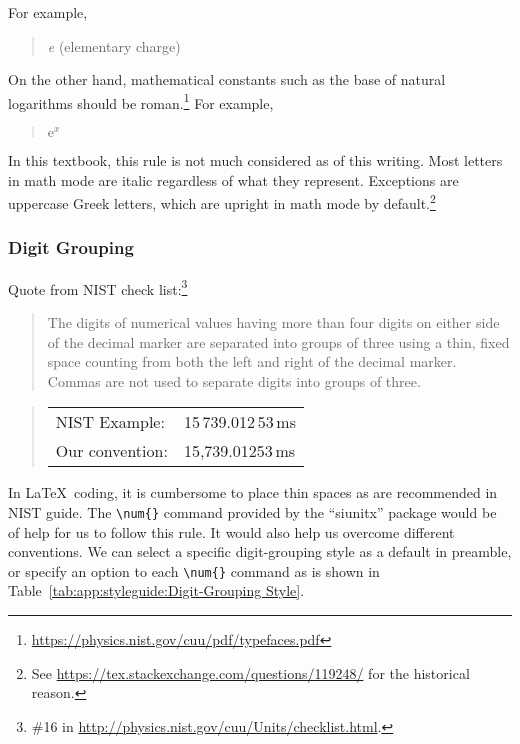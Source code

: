 For example,
\begin{quote}
  {\textit e} (elementary charge)
\end{quote}

On the other hand, mathematical constants such as the base
of natural logarithms should be roman.\footnote{
  \url{https://physics.nist.gov/cuu/pdf/typefaces.pdf}
}
For example,

\begin{quote}
  $\mathrm{e}^x$
\end{quote}

In this textbook, this rule is not much considered as of this writing.
Most letters in math mode are italic regardless of what they
represent. Exceptions are uppercase Greek letters, which are upright
in math mode by default.\footnote{
  See \url{https://tex.stackexchange.com/questions/119248/}
  for the historical reason.}

\subsubsection{Digit Grouping}
\label{sec:app:styleguide:Digit Grouping}

Quote from NIST check list:\footnote{
  \#16 in \url{http://physics.nist.gov/cuu/Units/checklist.html}.
}

\begin{quote}
  The digits of numerical values having more than four digits on either
  side of the decimal marker are separated into groups of three using
  a thin, fixed space counting from both the left and right of the decimal
  marker. Commas are not used to separate digits into groups of three.
\end{quote}

\begin{quote}
\begin{tabular}{ll}
  NIST Example:& 15\,739.012\,53\,ms\\
  Our convention:& 15,739.01253\,ms\\
\end{tabular}
\end{quote}

In \LaTeX\ coding, it is cumbersome to place thin spaces as are recommended
in NIST guide. The \verb|\num{}| command provided by the ``siunitx''
package would be of help for us to follow this rule.
It would also help us overcome different conventions.
We can select a specific digit-grouping style as
a default in preamble, or specify an option to each \verb|\num{}|
command as is shown in
Table~\ref{tab:app:styleguide:Digit-Grouping Style}.

